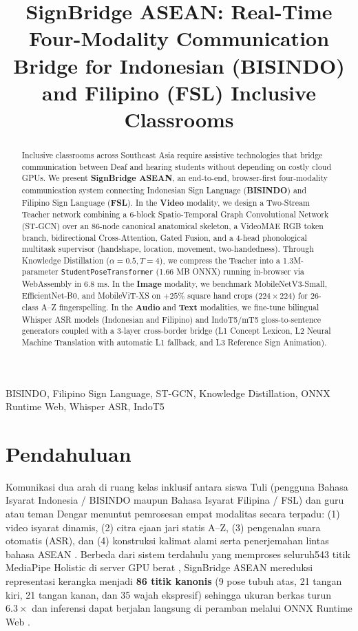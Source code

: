 \documentclass[conference]{IEEEtran}
\title{SignBridge ASEAN: Real-Time Four-Modality Communication Bridge for Indonesian (BISINDO) and Filipino (FSL) Inclusive Classrooms}
\author{
\IEEEauthorblockN{Farrel (Data \& Preprocessing), Jonnathan (Video \& Image Architecture), Gloria (Audio, Text, ONNX \& Web)}
\IEEEauthorblockA{Program Studi Informatika — Pembelajaran Mesin Lanjut\\
Kemitraan Pendidikan Inklusif Indonesia--Filipina (ASEAN)}
}
\begin{document}
\maketitle

\begin{abstract}
Inclusive classrooms across Southeast Asia require assistive technologies that bridge communication between Deaf and hearing students without depending on costly cloud GPUs. We present \textbf{SignBridge ASEAN}, an end-to-end, browser-first four-modality communication system connecting Indonesian Sign Language (\textbf{BISINDO}) and Filipino Sign Language (\textbf{FSL}). In the \textbf{Video} modality, we design a Two-Stream Teacher network combining a 6-block Spatio-Temporal Graph Convolutional Network (ST-GCN) over an 86-node canonical anatomical skeleton, a VideoMAE RGB token branch, bidirectional Cross-Attention, Gated Fusion, and a 4-head phonological multitask supervisor (handshape, location, movement, two-handedness). Through Knowledge Distillation ($\alpha=0.5, T=4$), we compress the Teacher into a 1.3M-parameter \texttt{StudentPoseTransformer} (1.66 MB ONNX) running in-browser via WebAssembly in 6.8 ms. In the \textbf{Image} modality, we benchmark MobileNetV3-Small, EfficientNet-B0, and MobileViT-XS on $+25\%$ square hand crops ($224\times 224$) for 26-class A--Z fingerspelling. In the \textbf{Audio} and \textbf{Text} modalities, we fine-tune bilingual Whisper ASR models (Indonesian and Filipino) and IndoT5/mT5 gloss-to-sentence generators coupled with a 3-layer cross-border bridge (L1 Concept Lexicon, L2 Neural Machine Translation with automatic L1 fallback, and L3 Reference Sign Animation).
\end{abstract}

\begin{IEEEkeywords}
BISINDO, Filipino Sign Language, ST-GCN, Knowledge Distillation, ONNX Runtime Web, Whisper ASR, IndoT5
\end{IEEEkeywords}

\section{Pendahuluan}
Komunikasi dua arah di ruang kelas inklusif antara siswa Tuli (pengguna Bahasa Isyarat Indonesia / BISINDO maupun Bahasa Isyarat Filipina / FSL) dan guru atau teman Dengar menuntut pemrosesan empat modalitas secara terpadu: (1) video isyarat dinamis, (2) citra ejaan jari statis A--Z, (3) pengenalan suara otomatis (ASR), dan (4) konstruksi kalimat alami serta penerjemahan lintas bahasa ASEAN \cite{rastgoo2021sign,koller2021quantitative,sari2025inclusive}. Berbeda dari sistem terdahulu yang memproses seluruh543 titik MediaPipe Holistic di server GPU berat \cite{jiang2021skeletor}, SignBridge ASEAN mereduksi representasi kerangka menjadi \textbf{86 titik kanonis} (9 pose tubuh atas, 21 tangan kiri, 21 tangan kanan, dan 35 wajah ekspresif) sehingga ukuran berkas turun $6.3\times$ dan inferensi dapat berjalan langsung di peramban melalui ONNX Runtime Web \cite{hidayat2025edge}.
\end{document}
